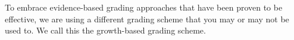 \documentclass[12pt]{article}
\begin{document}
        To embrace evidence-based grading approaches that have been proven to be effective, we are using a different grading scheme that you may or may not be used to. We call this the growth-based grading scheme.

\end{document}

